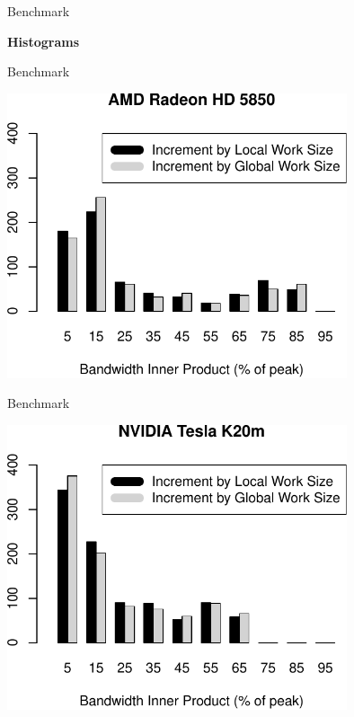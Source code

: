 

\begin{frame}{Benchmark}
  \begin{center} \Large \textbf{Histograms} \end{center}
\end{frame}

\begin{frame}{Benchmark}
  \begin{center} \includegraphics[width=0.75\textwidth]{figures/hd5850_double_hist_itertype_dot} \end{center}
\end{frame}

\begin{frame}{Benchmark}
  \begin{center} \includegraphics[width=0.75\textwidth]{figures/k20m_double_hist_itertype_dot} \end{center}
\end{frame}

